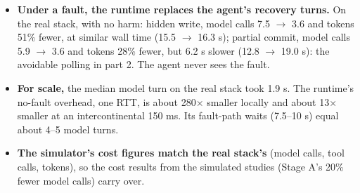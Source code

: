 \documentclass[letterpaper,twocolumn,10pt]{article}
\begin{document}
\begin{itemize}
\item \textbf{Under a fault, the runtime replaces the agent's recovery turns.} On the real stack, with no harm: hidden write, model calls 7.5 $\rightarrow$ 3.6 and tokens 51\% fewer, at similar wall time (15.5 $\rightarrow$ 16.3 s); partial commit, model calls 5.9 $\rightarrow$ 3.6 and tokens 28\% fewer, but 6.2 s slower (12.8 $\rightarrow$ 19.0 s): the avoidable polling in part 2. The agent never sees the fault.
\item \textbf{For scale,} the median model turn on the real stack took 1.9 s. The runtime's no-fault overhead, one RTT, is about 280$\times$ smaller locally and about 13$\times$ smaller at an intercontinental 150 ms. Its fault-path waits (7.5--10 s) equal about 4--5 model turns.
\item \textbf{The simulator's cost figures match the real stack's} (model calls, tool calls, tokens), so the cost results from the simulated studies (Stage A's 20\% fewer model calls) carry over.
\end{itemize}
\end{document}
